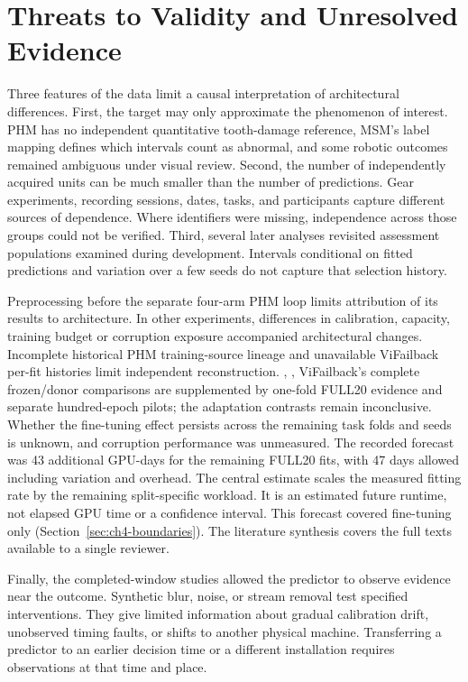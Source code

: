 \section{Threats to Validity and Unresolved Evidence}
Three features of the data limit a causal interpretation of architectural differences.
First, the target may only approximate the phenomenon of interest. PHM has no
independent quantitative tooth-damage reference, MSM's label mapping defines which
intervals count as abnormal, and some robotic outcomes remained ambiguous under visual
review. Second, the number of independently acquired units can be much smaller than the
number of predictions. Gear experiments, recording sessions, dates, tasks, and
participants capture different sources of dependence. Where identifiers were missing,
independence across those groups could not be verified. Third, several later analyses
revisited assessment populations examined during development. Intervals conditional on
fitted predictions and variation over a few seeds do not capture that selection history.

Preprocessing before the separate four-arm PHM loop limits attribution of its results to
architecture. In other experiments, differences in calibration, capacity, training
budget or corruption exposure accompanied architectural changes. Incomplete historical
PHM training-source lineage and unavailable ViFailback per-fit histories limit
independent reconstruction.
{, , }
ViFailback's complete frozen/donor comparisons are supplemented by one-fold FULL20
evidence and separate hundred-epoch pilots; the adaptation contrasts remain
inconclusive. Whether the fine-tuning effect persists across the remaining task folds
and seeds is unknown, and corruption performance was unmeasured. The recorded forecast
was 43 additional GPU-days for the remaining FULL20 fits, with 47 days allowed including
variation and overhead. The central estimate scales the measured fitting rate by the
remaining split-specific workload. It is an estimated future runtime, not elapsed
GPU time or a confidence interval. This forecast covered
fine-tuning only (Section~\ref{sec:ch4-boundaries}).
The literature synthesis covers the full texts available to a single reviewer.

Finally, the completed-window studies allowed the predictor to observe evidence near the
outcome. Synthetic blur, noise, or stream removal test specified interventions. They
give limited information about gradual calibration drift, unobserved timing faults, or
shifts to another physical machine. Transferring a predictor to an earlier decision time
or a different installation requires observations at that time and place.

